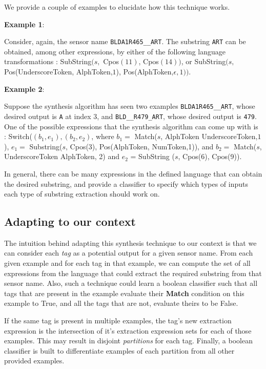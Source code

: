 We provide a couple of examples to elucidate how this technique works. 

{\bf Example 1}:

Consider, again, the sensor name \texttt{BLDA1R465\_\_ART}. The substring \texttt{ART} can be obtained, among other expressions, by either of the following language transformations :  SubString$(s, $ Cpos$(11)$, Cpos$(14))$, or SubString$(s,$ Pos(UnderscoreToken, AlphToken,$1$), Pos(AlphToken,$\epsilon, 1))$.

{\bf Example 2}: 

Suppose the synthesis algorithm has seen two examples \texttt{BLDA1R465\_\_ART}, whose desired output is \texttt{A} at index 3,  and \texttt{BLD\_\_R479\_ART}, whose desired output is \texttt{479}. One of the possible expressions that the synthesis algorithm can come up with is : Switch($(b_1, e_1), (b_2,e_2)$, where $b_1 =$ Match($s$, AlphToken UnderscoreToken,$1$), $e_1=$ Substring($s$, Cpos(3), Pos(AlphToken, NumToken,1)), and $b_2=$ Match($s$, UnderscoreToken AlphToken, 2) and $e_2$ = SubString ($s$, Cpos(6), Cpos(9)).

In general, there can be many expressions in the defined language that can obtain the desired substring, and provide a classifier to specify which types of inputs each type of substring extraction should work on.

%
%
%

\subsection{Adapting to our context}
\label{sec:adapt}

The intuition behind adapting this synthesis technique to our context is that we can consider each {\it tag} as a potential output for a given sensor name. From each given example and for each tag in that example, we can compute the set of all expressions from the language that could extract the required substring from that sensor name. Also, such a technique could learn a boolean classifier such that all tags that are present in the example evaluate their {\bf Match} condition on this example to True, and all the tags that are not, evaluate theirs to be False.

If the same tag is present in multiple examples, the tag's new extraction expression is the intersection of it's extraction expression sets for each of those examples. This may result in disjoint {\it partitions} for each tag. Finally, a boolean classifier is built to differentiate examples of each partition from all other provided examples. 

